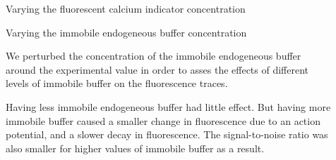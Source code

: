 \documentclass[final]{beamer}
\newlength{\sepwid}
\newlength{\onecolwid}
\begin{document}
\begin{frame}[t]
\begin{columns}[t]
\begin{column}{\onecolwid}
\begin{block}{Varying the fluorescent calcium indicator concentration}
\end{block}

\begin{block}{Varying the immobile endogeneous buffer concentration}

We perturbed the concentration of the immobile endogeneous buffer around the experimental value in order to asses the effects of different levels of immobile buffer on the fluorescence traces.

\hspace{2cm} Having less immobile endogeneous buffer had little effect. But having more immobile buffer caused a smaller change in fluorescence due to an action potential, and a slower decay in fluorescence. The signal-to-noise ratio was also smaller for higher values of immobile buffer as a result.

\end{block}
\end{column} %

\begin{column}{\sepwid}\end{column} %

\begin{column}{\onecolwid} %

\end{column}
\end{columns}
\end{frame}
\end{document}
